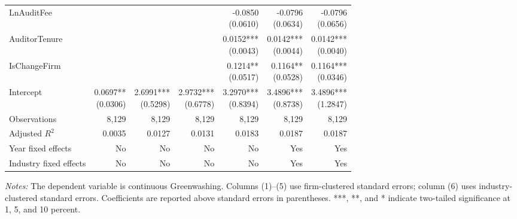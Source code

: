 \begin{table}[htbp]
{\begin{tabular}{lrrrrrr}
LnAuditFee &  &  &  & \shortstack{-0.0850 \\ (0.0610)} & \shortstack{-0.0796 \\ (0.0634)} & \shortstack{-0.0796 \\ (0.0656)}\\[8pt]
AuditorTenure &  &  &  & \shortstack{0.0152*** \\ (0.0043)} & \shortstack{0.0142*** \\ (0.0044)} & \shortstack{0.0142*** \\ (0.0040)}\\[8pt]
IsChangeFirm &  &  &  & \shortstack{0.1214** \\ (0.0517)} & \shortstack{0.1164** \\ (0.0528)} & \shortstack{0.1164*** \\ (0.0346)}\\[8pt]
Intercept & \shortstack{0.0697** \\ (0.0306)} & \shortstack{2.6991*** \\ (0.5298)} & \shortstack{2.9732*** \\ (0.6778)} & \shortstack{3.2970*** \\ (0.8394)} & \shortstack{3.4896*** \\ (0.8738)} & \shortstack{3.4896*** \\ (1.2847)}\\[8pt]
Observations & 8,129 & 8,129 & 8,129 & 8,129 & 8,129 & 8,129\\
Adjusted \(R^2\) & 0.0035 & 0.0127 & 0.0131 & 0.0183 & 0.0187 & 0.0187\\
Year fixed effects & No & No & No & No & Yes & Yes\\
Industry fixed effects & No & No & No & No & Yes & Yes\\
\hline\end{tabular}}
\begin{minipage}{0.98\textwidth}\footnotesize\textit{Notes:} The dependent variable is continuous Greenwashing. Columns (1)--(5) use firm-clustered standard errors; column (6) uses industry-clustered standard errors. Coefficients are reported above standard errors in parentheses. ***, **, and * indicate two-tailed significance at 1, 5, and 10 percent.\end{minipage}
\end{table}

